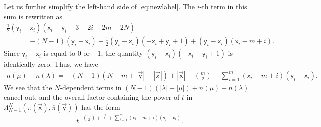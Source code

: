 \documentclass[pdftex]{sigma}
\numberwithin{equation}{section}
\begin{document}
Let us further simplify the left-hand side of
\eqref{eq:newlabel}.
The $i$-th term in this sum
is rewritten as
\begin{gather*}
	\frac12(\mathsf{y}_i-\mathsf{x}_i)(\mathsf{x}_i+\mathsf{y}_i+3+2i-2m-2N)\\
\qquad{}
	=
	-(N-1)(\mathsf{y}_i-\mathsf{x}_i)
	+
	\frac12(\mathsf{y}_i-\mathsf{x}_i)(-\mathsf{x}_i+\mathsf{y}_i+1)
	+
	(\mathsf{y}_i-\mathsf{x}_i)(\mathsf{x}_i-m+i).
\end{gather*}
Since $\mathsf{y}_i-\mathsf{x}_i$ is equal to $0$ or $-1$,
the quantity
$(\mathsf{y}_i-\mathsf{x}_i)(-\mathsf{x}_i+\mathsf{y}_i+1)$
is identically zero.
Thus, we have
\begin{align*}
	n(\mu)-n(\lambda)=
	-(N-1)(N+m+|\vec{\mathsf{y}}|-|\vec{\mathsf{x}}|)
	+|\vec{\mathsf{x}}|-\binom m2
	+\sum_{i=1}^{m}
	(\mathsf{x}_{i}-m+i)(\mathsf{y}_{i}-\mathsf{x}_{i}).
\end{align*}
We see that
the $N$-dependent terms
in
$(N-1)(|\lambda|-|\mu|)+n(\mu)-n(\lambda)$
cancel out, and the overall
factor containing the
power of $t$
in
$\Lambda^{N}_{N-1}(\pi(\vec{\mathsf{x}}),\overline\pi(\vec{\mathsf{y}}))$
has the form
\begin{equation*}%
	t^{-\binom m2+|\vec{\mathsf{x}}|
	+\sum_{i=1}^{m}
	(\mathsf{x}_{i}-m+i)(\mathsf{y}_{i}-\mathsf{x}_{i})}.
\end{equation*}
\end{document}
